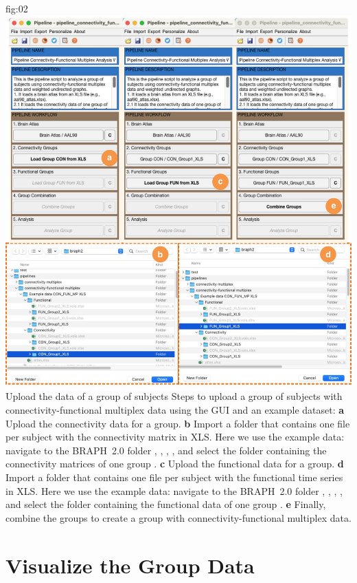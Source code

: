 \documentclass[justified]{tufte-handout}
\begin{document}
	{fig:02}
	{
	\includegraphics{fig02.jpg}
	}
	{Upload the data of a group of subjects}
	{
	Steps to upload a group of subjects with connectivity-functional multiplex data using the GUI and an example dataset: 
	{\bf a} Upload the connectivity data for a group.
	{\bf b} Import a folder that contains one file per subject with the connectivity matrix in XLS. Here we use the example data: navigate to the BRAPH~2.0 folder , ,  , , and select the folder containing the connectivity matrices of one group .
     {\bf c} Upload the functional data for a group.
 	{\bf d} Import a folder that contains one file per subject with the functional time series in XLS. Here we use the example data: navigate to the BRAPH~2.0 folder , ,  , , and select the folder containing the functional data of one group .
   {\bf e} Finally, combine the groups to create a group with connectivity-functional multiplex data.
	}
 
\section{Visualize the Group Data}
\end{document}
